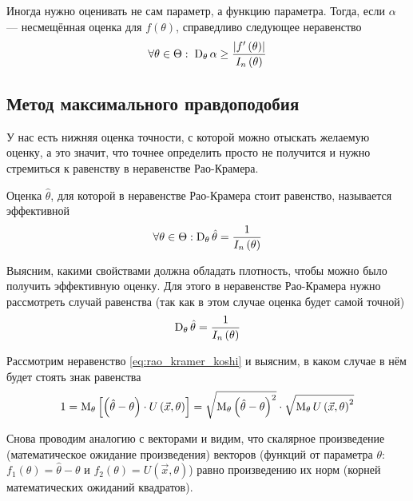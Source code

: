 \begin{remark}
    Иногда нужно оценивать не сам параметр, а функцию параметра.
    Тогда, если $\alpha$ --- несмещённая оценка для $f\left(\theta\right)$,
    справедливо следующее неравенство
    $$\forall\theta\in\Theta:\;\operatorname{D}_{\theta} \alpha
        \ge\frac{\left|f'\left(\theta\right)\right|}{I_n\left(\theta\right)}$$
\end{remark}

\subsection{Метод максимального правдоподобия}
У нас есть нижняя оценка точности,
с которой можно отыскать желаемую оценку, а это значит,
что точнее определить просто не получится
и нужно стремиться к равенству в неравенстве Рао-Крамера.

\begin{definition}
    Оценка $\hat{\theta}$,
    для которой в неравенстве Рао-Крамера стоит равенство,
    называется эффективной
    $$\forall\theta\in\Theta:
        \operatorname{D}_{\theta} \hat{\theta}=\frac{1}{I_n\left(\theta\right)}$$
\end{definition}

Выясним, какими свойствами должна обладать плотность,
чтобы можно было получить эффективную оценку.
Для этого в неравенстве Рао-Крамера нужно рассмотреть случай равенства
(так как в этом случае оценка будет самой точной)
    $$\operatorname{D}_{\theta} \hat{\theta}=\frac{1}{I_n\left(\theta\right)}$$

Рассмотрим неравенство \eqref{eq:rao_kramer_koshi} и выясним,
в каком случае в нём будет стоять знак равенства
    $$1 = \operatorname{M}_{\theta} 
        \left[\left(\hat{\theta}-\theta\right)
            \cdot U\left( \vec{x},\theta \right)\right]
        = \sqrt{\operatorname{M}_{\theta} 
        \left(\hat{\theta}-\theta\right)^2}
        \cdot\sqrt{\operatorname{M}_{\theta} U\left( \vec{x},\theta \right)^2}$$

Снова проводим аналогию с векторами и видим,
что скалярное произведение (математическое ожидание произведения)
векторов
(функций от параметра $\theta$:
$f_1\left( \theta \right)=\hat{\theta}-\theta$ и
$f_2\left( \theta \right)=U\left( \vec{x},\theta \right)$)
равно произведению их норм (корней математических ожиданий квадратов).

